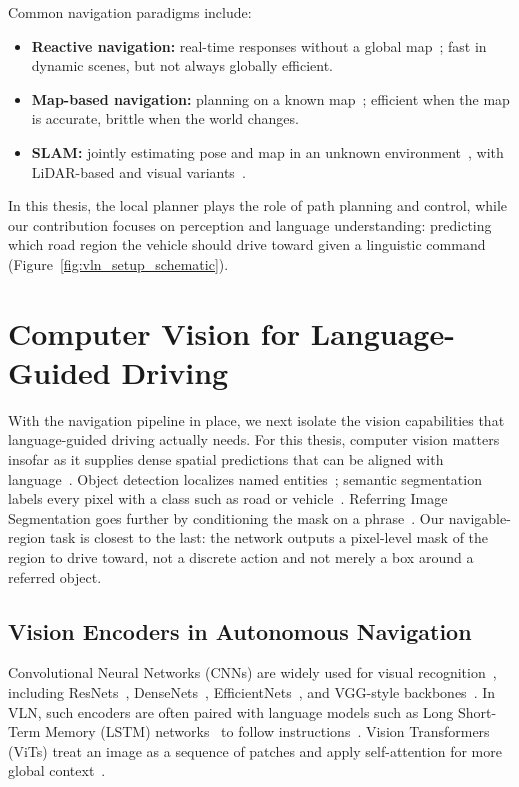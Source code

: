 Common navigation paradigms include:

\begin{itemize}
    \item \textbf{Reactive navigation:} real-time responses without a global map~\cite{Arkin1998,Braitenberg1986}; fast in dynamic scenes, but not always globally efficient.
    \item \textbf{Map-based navigation:} planning on a known map~\cite{Thrun2005,Elfes1989}; efficient when the map is accurate, brittle when the world changes.
    \item \textbf{SLAM:} jointly estimating pose and map in an unknown environment~\cite{DurrantWhyte2006,Thrun2004,Leonard1991}, with LiDAR-based and visual variants~\cite{Zhang2014}.
\end{itemize}

In this thesis, the local planner plays the role of path planning and control, while our contribution focuses on perception and language understanding: predicting which road region the vehicle should drive toward given a linguistic command (Figure~\ref{fig:vln_setup_schematic}).

\section{Computer Vision for Language-Guided Driving}

With the navigation pipeline in place, we next isolate the vision capabilities that language-guided driving actually needs. For this thesis, computer vision matters insofar as it supplies dense spatial predictions that can be aligned with language~\cite{Szeliski2010,Chen2015}. Object detection localizes named entities~\cite{redmon2016you,Ren2017Faster}; semantic segmentation labels every pixel with a class such as road or vehicle~\cite{badrinarayanan2017segnet,cordts2016cityscapes}. Referring Image Segmentation goes further by conditioning the mask on a phrase~\cite{hu2016segmentation}. Our navigable-region task is closest to the last: the network outputs a pixel-level mask of the region to drive toward, not a discrete action and not merely a box around a referred object.

\subsection{Vision Encoders in Autonomous Navigation}

Convolutional Neural Networks (CNNs) are widely used for visual recognition~\cite{Krizhevsky2017ImageNet}, including ResNets~\cite{He2016Deep}, DenseNets~\cite{Huang2017Densely}, EfficientNets~\cite{tan2019efficientnet}, and VGG-style backbones~\cite{simonyan2014very}. In VLN, such encoders are often paired with language models such as Long Short-Term Memory (LSTM) networks~\cite{Hochreiter1997Long} to follow instructions~\cite{anderson2018vision}. Vision Transformers (ViTs) treat an image as a sequence of patches and apply self-attention for more global context~\cite{dosovitskiy2020image,vaswani2017attention}.

